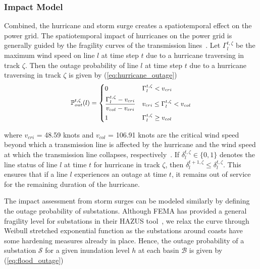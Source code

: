 \documentclass[hidelinks, 12pt]{article}
\begin{document}
\subsubsection{Impact Model}
Combined, the hurricane and storm surge creates a spatiotemporal effect on the power grid. The spatiotemporal impact of hurricanes on the power grid is generally guided by the fragility curves of the transmission lines~\cite{7801854}. Let $\Gamma_{l}^{t,\zeta}$ be the maximum wind speed on line $l$ at time step $t$ due to a hurricane traversing in track $\zeta$. Then the outage probability of line $l$ at time step $t$ due to a hurricane traversing in track $\zeta$ is given by (\ref{eq:hurricane_outage})      
\vspace{-1em}
\begin{equation}
\small
\begin{aligned}
&\mathbb{P}_{out}^{t,\zeta}(l)= \begin{dcases} 0 & \Gamma_{l}^{t,\zeta} < v_{cri} \\
\frac{\Gamma_{l}^{t,\zeta} - v_{cri}}{v_{col} - v_{cri}}  & v_{cri} \leq \Gamma_{l}^{t,\zeta} < v_{col} \\
1 & \Gamma_{l}^{t,\zeta} \geq v_{col} \end{dcases} \\
\end{aligned}
\label{eq:hurricane_outage}
\end{equation}

\noindent
where $v_{cri}$ = 48.59 knots and $v_{col}$ = 106.91 knots are the critical wind speed beyond which a transmission line is affected by the hurricane and the wind speed at which the transmission line collapses, respectively~\cite{9917119}. If $\delta_{l}^{t,\zeta} \in \{0,1\}$ denotes the line status of line $l$ at time $t$ for hurricane in track $\zeta$, then $\delta_{l}^{t + 1,\zeta} \leq  \delta_{l}^{t,\zeta}$. This ensures that if a line $l$ experiences an outage at time $t$, it remains out of service for the remaining duration of the hurricane.    

The impact assessment from storm surges can be modeled similarly by defining the outage probability of substations. Although FEMA has provided a general fragility level for substations in their HAZUS tool~\cite{hazus_flood}, we relax the curve through Weibull stretched exponential function as the substations around coasts have some hardening measures already in place. Hence, the outage probability of a substation $\mathcal{S}$ for a given inundation level $h$ at each basin $\mathcal{B}$ is given by (\ref{eq:flood_outage})
\end{document}
